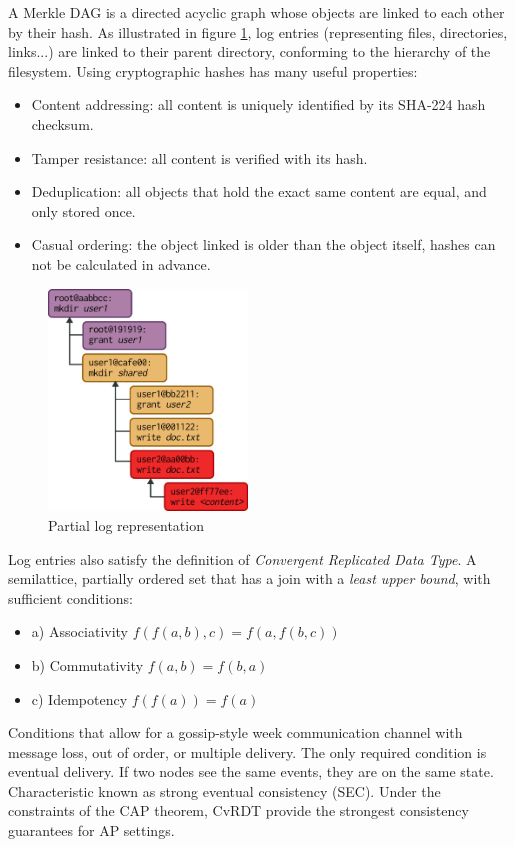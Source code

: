 \documentclass{sig-alternate}
\begin{document}
A Merkle DAG is a directed acyclic graph whose objects are linked to each other by their hash. As illustrated in figure \ref{fig:log}, log entries (representing files, directories, links...) are linked to their parent directory, conforming to the hierarchy of the filesystem. Using cryptographic hashes has many useful properties:

\begin{itemize}
\item Content addressing: all content is uniquely identified by its SHA-224 hash checksum.
\item Tamper resistance: all content is verified with its hash.
\item Deduplication: all objects that hold the exact same content are equal, and only stored once.
\item Casual ordering: the object linked is older than the object itself, hashes can not be calculated in advance.
\end{itemize}


\begin{figure}
\centering
\includegraphics[width=150pt]{imgs/log.png}
\caption{Partial log representation}
\label{fig:log}
\end{figure}

Log entries also satisfy the definition of \textit{Convergent Replicated Data Type}. A semilattice, partially ordered set that has a join with a \textit{least upper bound}, with sufficient conditions:

\begin{itemize}
 \item a) Associativity $f(f(a, b), c) = f(a, f(b, c))$
 \item b) Commutativity $f(a, b) = f(b, a)$
 \item c) Idempotency $f(f(a)) = f(a)$
\end{itemize}

Conditions that allow for a gossip-style week communication channel with message loss, out of order, or multiple delivery. The only required condition is eventual delivery. If two nodes see the same events, they are on the same state. Characteristic known as strong eventual consistency (SEC). Under the constraints of the CAP theorem, CvRDT provide the strongest consistency guarantees for AP settings\cite{Wikipedia:CRDT}.
\end{document}
